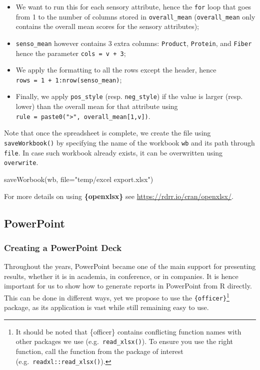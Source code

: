 \documentclass[
]{book}
\newenvironment{Shaded}{\begin{snugshade}}{\end{snugshade}}
\newcommand{\AttributeTok}[1]{\textcolor[rgb]{0.77,0.63,0.00}{#1}}
\newcommand{\FunctionTok}[1]{\textcolor[rgb]{0.00,0.00,0.00}{#1}}
\newcommand{\NormalTok}[1]{#1}
\newcommand{\StringTok}[1]{\textcolor[rgb]{0.31,0.60,0.02}{#1}}
\providecommand{\tightlist}{%
  \setlength{\itemsep}{0pt}\setlength{\parskip}{0pt}}
\begin{document}
\begin{itemize}
\tightlist
\item
  We want to run this for each sensory attribute, hence the \texttt{for} loop that goes from 1 to the number of columns stored in \texttt{overall\_mean} (\texttt{overall\_mean} only contains the overall mean scores for the sensory attributes);
\item
  \texttt{senso\_mean} however contains 3 extra columns: \texttt{Product}, \texttt{Protein}, and \texttt{Fiber} hence the parameter \texttt{cols\ =\ v\ +\ 3};
\item
  We apply the formatting to all the rows except the header, hence \texttt{rows\ =\ 1\ +\ 1:nrow(senso\_mean)};
\item
  Finally, we apply \texttt{pos\_style} (resp. \texttt{neg\_style}) if the value is larger (resp. lower) than the overall mean for that attribute using \texttt{rule\ =\ paste0("\textgreater{}",\ overall\_mean{[}1,v{]})}.
\end{itemize}

Note that once the spreadsheet is complete, we create the file using \texttt{saveWorkbook()} by specifying the name of the workbook \texttt{wb} and its path through \texttt{file}. In case such workbook already exists, it can be overwritten using \texttt{overwrite}.

\begin{Shaded}
\begin{Highlighting}[]
\FunctionTok{saveWorbook}\NormalTok{(wb, }\AttributeTok{file=}\StringTok{"temp/excel export.xlsx"}\NormalTok{)}
\end{Highlighting}
\end{Shaded}

For more details on using \textbf{\{openxlsx\}} see \url{https://rdrr.io/cran/openxlsx/}.

\hypertarget{powerpoint}{%
\subsection{PowerPoint}\label{powerpoint}}

\hypertarget{creating-a-powerpoint-deck}{%
\subsubsection{Creating a PowerPoint Deck}\label{creating-a-powerpoint-deck}}

Throughout the years, PowerPoint became one of the main support for presenting results, whether it is in academia, in conference, or in companies. It is hence important for us to show how to generate reports in PowerPoint from R directly. This can be done in different ways, yet we propose to use the \texttt{\{officer\}}\footnote{It should be noted that \{officer\} contains conflicting function names with other packages we use (e.g.~\texttt{read\_xlsx()}). To ensure you use the right function, call the function from the package of interest (e.g.~\texttt{readxl::read\_xlsx()}).} package, as its application is vast while still remaining easy to use.
\end{document}
